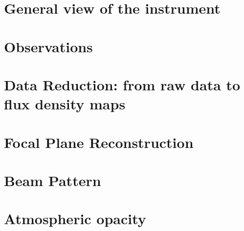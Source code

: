 \documentclass[traditionalabstract]{aa}
\begin{document}
\section{General view of the instrument}
\label{se:instru}



\section{Observations}
\label{se:observations}



\section{Data Reduction: from raw data to flux density maps}
\label{se:dataproc}


\section{Focal Plane Reconstruction}
\label{se:geometry}


\section{Beam Pattern}
\label{se:beam}


\section{Atmospheric opacity}
\label{se:opacity}

\end{document}
